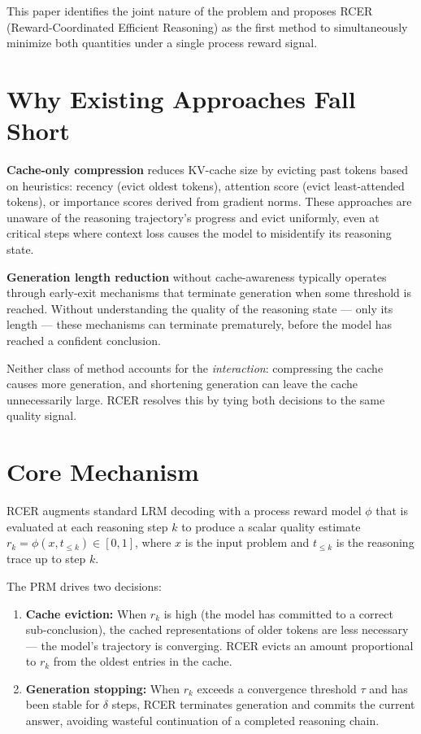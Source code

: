 \documentclass[10pt,twocolumn]{article}
\begin{document}
This paper identifies the joint nature of the problem and proposes RCER
(Reward-Coordinated Efficient Reasoning) as the first method to simultaneously
minimize both quantities under a single process reward signal.

\section{Why Existing Approaches Fall Short}

\textbf{Cache-only compression} reduces KV-cache size by evicting past tokens
based on heuristics: recency (evict oldest tokens), attention score (evict
least-attended tokens), or importance scores derived from gradient norms.
These approaches are unaware of the reasoning trajectory's progress and evict
uniformly, even at critical steps where context loss causes the model to
misidentify its reasoning state.

\textbf{Generation length reduction} without cache-awareness typically operates
through early-exit mechanisms that terminate generation when some threshold is
reached. Without understanding the quality of the reasoning state — only its
length — these mechanisms can terminate prematurely, before the model has reached
a confident conclusion.

Neither class of method accounts for the \emph{interaction}: compressing the
cache causes more generation, and shortening generation can leave the cache
unnecessarily large. RCER resolves this by tying both decisions to the same
quality signal.

\section{Core Mechanism}

RCER augments standard LRM decoding with a process reward model $\phi$
that is evaluated at each reasoning step $k$ to produce a scalar quality
estimate $r_k = \phi(x, t_{\leq k}) \in [0, 1]$, where $x$ is the input
problem and $t_{\leq k}$ is the reasoning trace up to step $k$.

The PRM drives two decisions:
\begin{enumerate}[itemsep=2pt,parsep=0pt]
  \item \textbf{Cache eviction:} When $r_k$ is high (the model has committed to
    a correct sub-conclusion), the cached representations of older tokens are
    less necessary — the model's trajectory is converging. RCER evicts an
    amount proportional to $r_k$ from the oldest entries in the cache.
  \item \textbf{Generation stopping:} When $r_k$ exceeds a convergence threshold
    $\tau$ and has been stable for $\delta$ steps, RCER terminates generation
    and commits the current answer, avoiding wasteful continuation of a
    completed reasoning chain.
\end{enumerate}
\end{document}
